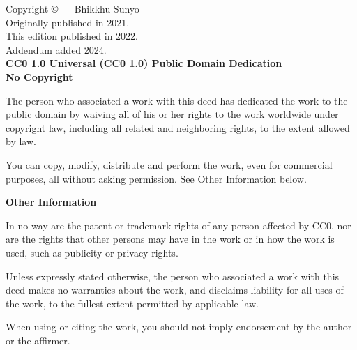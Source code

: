 \documentclass[10pt, openany]{book}
\begin{document}
\newpage
\begin{small}
\begin{sffamily}
\noindent Copyright © — Bhikkhu Sunyo\\

\noindent Originally published in 2021.\\\noindent This edition published in 2022.\\\noindent Addendum added 2024.\\

\noindent\textbf{CC0 1.0 Universal (CC0 1.0) Public Domain Dedication}\\



\noindent\textbf{No Copyright}

\noindent The person who associated a work with this deed has dedicated the work to the public domain by waiving all of his or her rights to the work worldwide under copyright law, including all related and neighboring rights, to the extent allowed by law.

\noindent You can copy, modify, distribute and perform the work, even for commercial purposes, all without asking permission. See Other Information below.


\noindent\textbf{Other Information}

\noindent In no way are the patent or trademark rights of any person affected by CC0, nor are the rights that other persons may have in the work or in how the work is used, such as publicity or privacy rights.

\noindent Unless expressly stated otherwise, the person who associated a work with this deed makes no warranties about the work, and disclaims liability for all uses of the work, to the fullest extent permitted by applicable law.

\noindent When using or citing the work, you should not imply endorsement by the author or the affirmer.

\end{sffamily}
\end{small}


\tableofcontents

\mainmatter
\pagestyle{fancy}

			
			
			
\end{document}
